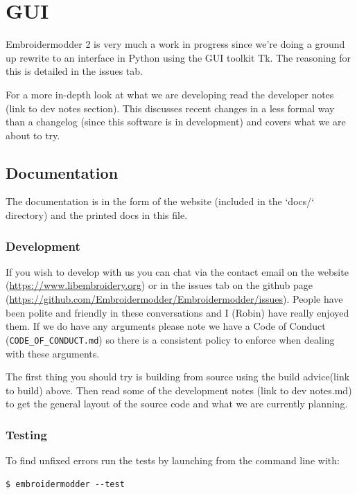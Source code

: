 \documentclass[a4paper]{report}
\begin{document}
\chapter{GUI}

Embroidermodder 2 is very much a work in progress since we're doing a ground
up rewrite to an interface in Python using the GUI toolkit Tk. The reasoning for
this is detailed in the issues tab.

For a more in-depth look at what we are developing read the developer notes (link to dev notes
section). This discusses recent changes in a less formal way than a changelog (since this
software is in development) and covers what we are about to try.

\section{Documentation}

The documentation is in the form of the website
(included in the `docs/` directory) and the printed docs in this file.

\subsection{Development}

If you wish to develop with us you can chat via the contact email on the
website (\url{https://www.libembroidery.org}) or in the issues tab on the
github page (\url{https://github.com/Embroidermodder/Embroidermodder/issues}).
People have been polite and friendly in these conversations and I (Robin) have
really enjoyed them. If we do have any arguments please note we have a Code of
Conduct (\texttt{CODE\_OF\_CONDUCT.md}) so there is a consistent policy to enforce when
dealing with these arguments.

The first thing you should try is building from source using the build advice(link to build)
above. Then read some of the development notes (link to dev notes.md) to get the general
layout of the source code and what we are currently planning.

\subsection{Testing}

To find unfixed errors run the tests by launching from the command line with:

\begin{lstlisting}
$ embroidermodder --test
\end{lstlisting}
\end{document}
